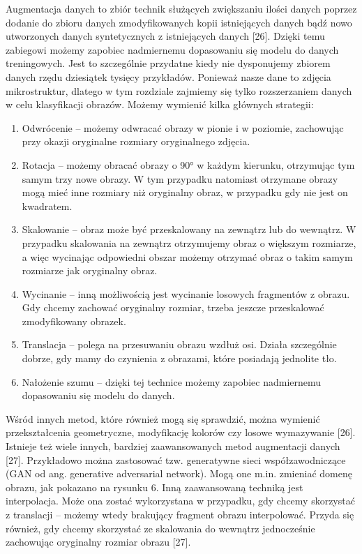 Augmentacja danych to zbiór technik służących zwiększaniu ilości danych poprzez dodanie do zbioru danych zmodyfikowanych kopii istniejących danych bądź nowo utworzonych danych syntetycznych z istniejących danych [26]. Dzięki temu zabiegowi możemy zapobiec nadmiernemu dopasowaniu się modelu do danych treningowych. Jest to szczególnie przydatne kiedy nie dysponujemy zbiorem danych rzędu dziesiątek tysięcy przykładów. Ponieważ nasze dane to zdjęcia mikrostruktur, dlatego w tym rozdziale zajmiemy się tylko rozszerzaniem danych w celu klasyfikacji obrazów. Możemy wymienić kilka głównych strategii:

\begin{enumerate}
	\item Odwrócenie – możemy odwracać obrazy w pionie i w poziomie, zachowując przy okazji oryginalne rozmiary oryginalnego zdjęcia.

	\item Rotacja – możemy obracać obrazy o 90° w każdym kierunku, otrzymując tym samym trzy nowe obrazy. W tym przypadku natomiast otrzymane obrazy mogą mieć inne rozmiary niż oryginalny obraz, w przypadku gdy nie jest on kwadratem.

	\item Skalowanie – obraz może być przeskalowany na zewnątrz lub do wewnątrz. W przypadku skalowania na zewnątrz otrzymujemy obraz o większym rozmiarze, a więc wycinając odpowiedni obszar możemy otrzymać obraz o takim samym rozmiarze jak oryginalny obraz.

	\item Wycinanie – inną możliwością jest wycinanie losowych fragmentów z obrazu. Gdy chcemy zachować oryginalny rozmiar, trzeba jeszcze przeskalować zmodyfikowany obrazek.

	\item Translacja – polega na przesuwaniu obrazu wzdłuż osi. Działa szczególnie dobrze, gdy mamy do czynienia z obrazami, które posiadają jednolite tło.

	\item Nałożenie szumu – dzięki tej technice możemy zapobiec nadmiernemu dopasowaniu się modelu do danych. 
\end{enumerate}
Wśród innych metod, które również mogą się sprawdzić, można wymienić przekształcenia geometryczne, modyfikację kolorów czy losowe wymazywanie [26]. Istnieje też wiele innych, bardziej zaawansowanych metod augmentacji danych [27]. Przykładowo można zastosować tzw. generatywne sieci współzawodniczące (GAN od ang. generative adversarial network). Mogą one m.in. zmieniać domenę obrazu, jak pokazano na rysunku 6. Inną zaawansowaną techniką jest interpolacja. Może ona zostać wykorzystana w przypadku, gdy chcemy skorzystać z translacji – możemy wtedy brakujący fragment obrazu interpolować. Przyda się również, gdy chcemy skorzystać ze skalowania do wewnątrz jednocześnie zachowując oryginalny rozmiar obrazu [27]. 

